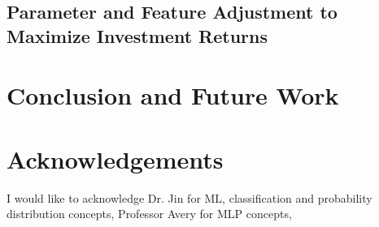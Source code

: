 \documentclass[twocolumn,10pt]{article}
\begin{document}
\begin{multicols}{2}
\begin{flushleft}
	\subsection{Parameter and Feature Adjustment to Maximize Investment Returns} \label{adjustment_models}
	
	
	
	\section{Conclusion and Future Work} \label{conclusion}
		
	
	\section{Acknowledgements} \label{acknowledgements}
	I would like to acknowledge Dr. Jin \cite{rjin} for ML, classification and probability distribution concepts, Professor Avery \cite{avery} for MLP concepts, 




\end{flushleft}
\end{multicols}
\end{document}
